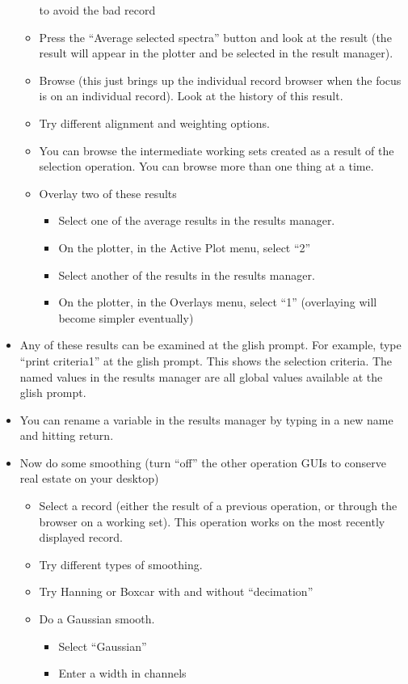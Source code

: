 \begin{itemize}
\begin{itemize}
to avoid the bad record
\item Press the ``Average selected spectra'' button and look at the result
(the result will appear in the plotter and be selected in the result manager).
\item Browse (this just brings up the individual record browser when the focus
is on an individual record).  Look at the history of this result.
\item Try different alignment and weighting options.
\item You can browse the intermediate working sets created as a result of
the selection operation.  You can browse more than one thing at a time.
\item Overlay two of these results
\begin{itemize}
\item Select one of the average results in the results manager.
\item On the plotter, in the Active Plot menu, select ``2''
\item Select another of the results in the results manager.
\item On the plotter, in the Overlays menu, select ``1'' 
(overlaying will become simpler eventually)
\end{itemize}
\end{itemize}
\item Any of these results can be examined at the glish prompt.
For example, type ``print criteria1'' at the glish prompt.  This shows
the selection criteria.  The named values in the results manager are all
global values available at the glish prompt.
\item You can rename a variable in the results manager by typing in a
new name and hitting return.
\item Now do some smoothing (turn ``off'' the other operation GUIs to
conserve real estate on your desktop)
\begin{itemize}
\item Select a record (either the result of a previous operation, or
through the browser on a working set).  This operation works on the
most recently displayed record.
\item Try different types of smoothing.
\item Try Hanning or Boxcar with and without ``decimation''
\item Do a Gaussian smooth.
\begin{itemize}
\item Select ``Gaussian''
\item Enter a width in channels

\end{itemize}
\end{itemize}
\end{itemize}
